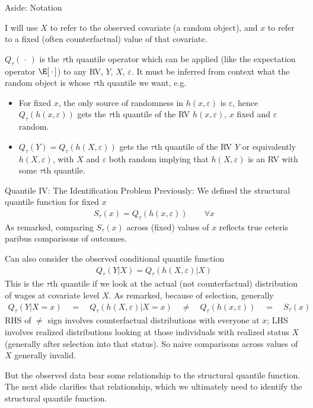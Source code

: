 \documentclass[aspectratio=169, handout]{beamer}
\begin{document}
{\footnotesize
\begin{frame}[shrink]{Aside: Notation}

I will use $X$ to refer to the \alert{observed} covariate (a random
object), and $x$ to refer to a fixed (often counterfactual) value of
that covariate.

$Q_\tau(\,\cdot\,)$ is the $\tau$th quantile operator which can be
applied (like the expectation operator $\E[\,\cdot\,]$) to any RV,
$Y$, $X$, $\varepsilon$.
It must be inferred from context what the random object is
whose $\tau$th quantile we want, e.g.
\begin{itemize}
  \item For fixed $x$, the only source of randomness in
    $h(x,\varepsilon)$ is $\varepsilon$, hence
    $Q_\tau(h(x,\varepsilon))$ gets the $\tau$th quantile of the RV
    $h(x,\varepsilon)$, $x$ fixed and $\varepsilon$ random.
  \item
    $Q_\tau(Y)=Q_\tau(h(X,\varepsilon))$ gets the $\tau$th quantile of
    the RV $Y$ or equivalently $h(X,\varepsilon)$, with $X$ and
    $\varepsilon$ both random implying that $h(X,\varepsilon)$ is an RV
    with some $\tau$th quantile.
\end{itemize}
\end{frame}
}



{\scriptsize
\begin{frame}{Quantile IV: The Identification Problem}
Previously:
We defined the \alert{structural} quantile function for fixed $x$
\begin{align*}
  S_\tau(x) = Q_\tau(h(x,\varepsilon))
  \qquad
  \forall x
\end{align*}
As remarked, comparing $S_\tau(x)$ across (fixed) values of $x$ reflects
true ceteris paribus comparisons of outcomes.

Can also consider the \alert{observed} conditional quantile function
\begin{align*}
  Q_\tau(Y|X)
  =
  Q_\tau(h(X,\varepsilon)|X)
\end{align*}
This is the $\tau$th quantile if we look at the \alert{actual} (not
counterfactual) distribution of wages at covariate level $X$.
As remarked, because of selection, generally
\begin{align*}
  Q_\tau(Y|X=x)
  \quad
  =
  \quad
  Q_\tau(h(X,\varepsilon)|X=x)
  \quad
  \neq
  \quad
  Q_\tau(h(x,\varepsilon))
  \quad
  =
  \quad
  S_\tau(x)
\end{align*}
RHS of $\neq$ sign involves counterfactual distributions with everyone
at $x$; LHS involves realized distributions looking at those individuals
with realized status $X$ (generally after selection into that status).
So naive comparisons across values of $X$ generally invalid.

But the observed data bear \alert{some} relationship to the structural
quantile function.
The next slide clarifies that relationship, which we ultimately need to
identify the structural quantile function.
\end{frame}
}
\end{document}
